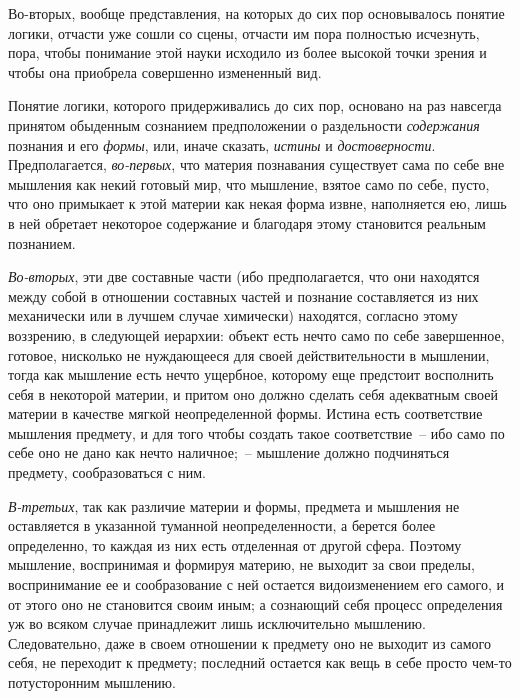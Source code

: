 Во-вторых, вообще представления, на которых до сих
пор основывалось понятие логики, отчасти уже сошли
со сцены, отчасти им пора полностью исчезнуть, пора,
чтобы понимание этой науки исходило из более высокой
точки зрения и чтобы она приобрела совершенно измененный
вид.

Понятие логики, которого придерживались до сих пор,
основано на раз навсегда принятом обыденным сознанием
предположении о раздельности \emph{содержания} познания
и его \emph{формы}, или, иначе сказать, \emph{истины} и \emph{достоверности}.
Предполагается, \emph{во-первых}, что материя познавания существует
сама по себе вне мышления как некий готовый
мир, что мышление, взятое само по себе, пусто, что оно
примыкает к этой материи как некая форма извне, наполняется
ею, лишь в ней обретает некоторое содержание
и благодаря этому становится реальным познанием.

\emph{Во-вторых}, эти две составные части (ибо предполагается,
что они находятся между собой в отношении составных
частей и познание составляется из них механически
или в лучшем случае химически)\endnotemark{} находятся,
согласно этому воззрению, в следующей иерархии: объект
есть нечто само по себе завершенное, готовое,
нисколько не нуждающееся для своей действительности
в мышлении, тогда как мышление есть нечто ущербное,
которому еще предстоит восполнить себя в некоторой
материи, и притом оно должно сделать себя адекватным
своей материи в качестве мягкой неопределенной формы.
Истина есть соответствие мышления предмету, и для
того чтобы создать такое соответствие~-- ибо само по
себе оно не дано как нечто наличное;~-- мышление должно
подчиняться предмету, сообразоваться с ним.


\emph{В-третьих}, так как различие материи и формы, предмета
и мышления не оставляется в указанной туманной
неопределенности, а берется более определенно, то каждая
из них есть отделенная от другой сфера. Поэтому
мышление, воспринимая и формируя материю, не выходит
за свои пределы, воспринимание ее и сообразование
с ней остается видоизменением его самого, и от этого
оно не становится своим иным; а сознающий себя процесс
определения уж во всяком случае принадлежит
лишь исключительно мышлению. Следовательно, даже в
своем отношении к предмету оно не выходит из самого
себя, не переходит к предмету; последний остается как
вещь в себе просто чем-то потусторонним мышлению.

